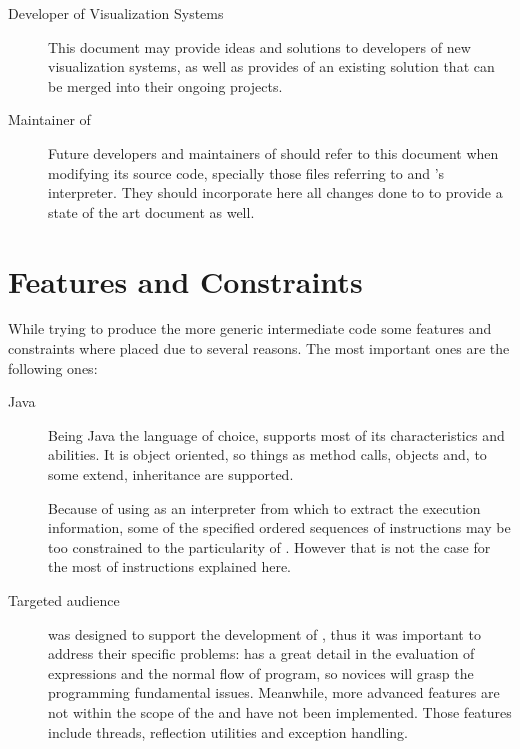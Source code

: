 \begin{description}
	\item[Developer of Visualization Systems] This document may provide ideas and solutions to developers of new visualization systems, as well as provides of an existing solution that can be merged into their ongoing projects.
	
	\item[Maintainer of \jel{}] Future developers and maintainers of \jel{} should refer to this document when modifying its source code, specially those files referring to \djava{} and \jel{}'s interpreter. They should incorporate here all changes done to \mcode{} to provide a state of the art document as well. 
	
\end{description}

\section{Features and Constraints}
\label{sec:features}

While trying to produce the more generic intermediate code some features and constraints where placed due to several reasons. The most important ones are the following ones:

\begin{description}
	\item[Java] Being Java the language of choice, \mcode{} supports most of its characteristics and abilities. It is object oriented, so things as method calls, objects and, to some extend, inheritance are supported.
	
	\item[\djava{}]Because of using \djava{} as an interpreter from which to extract the execution information, some of the specified ordered sequences of instructions may be too constrained to the particularity of \djava{}. However that is not the case for the most of instructions explained here.
	
	\item[Targeted audience] \mcode{} was designed to support the development of \mcode{}, thus it was important to address their specific problems: \mcode{} has a great detail in the evaluation of expressions and the normal flow of program, so novices will grasp the programming fundamental issues. Meanwhile, more advanced features are not within the scope of the \mcode{} and have not been implemented. Those features include threads, reflection utilities and exception handling. 
	
\end{description}

